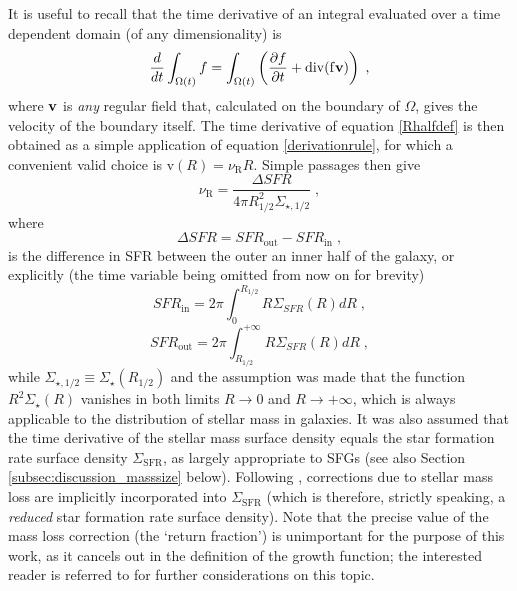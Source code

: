 \documentclass[fleqn,usenatbib]{mnras}
\begin{document}
It is useful to recall that the time derivative of an integral evaluated over a time dependent domain (of any dimensionality) is
\begin{equation}\label{derivationrule}
\frac{d}{dt} \int_{\Omega(t)} f = \int_{\Omega(t)} \left( \frac{\partial f}{\partial t} + \rm{div} (f\bf{v}) \right) \; ,
\end{equation}
where $\bf{v}$ is \emph{any} regular field that, calculated on the boundary of $\Omega$, gives the velocity of the boundary itself. The time derivative of equation \eqref{Rhalfdef} is then obtained as a simple application of equation \eqref{derivationrule}, for which a convenient valid choice is $\mathrm{v}(R) = \nu_\textrm{R} R$. Simple passages then give
\begin{equation}\label{nuRcalc}
\nu_\textrm{R} = \frac{ \Delta SFR}{4 \pi R_{1/2}^2 \Sigma_{\star, 1/2}} \; ,
\end{equation}
where
\begin{equation}\label{deltaSFR}
\Delta SFR = SFR_\textrm{out}-SFR_\textrm{in} \;,
\end{equation}
is the difference in SFR between the outer an inner half of the galaxy, or explicitly (the time variable being omitted from now on for brevity)
\begin{equation}
SFR_\textrm{in} = 2 \pi \int_0^{R_{1/2}} R \Sigma_{SFR}(R) dR \;,
\end{equation}
\begin{equation}
SFR_\textrm{out} = 2 \pi \int_{R_{1/2}}^{+\infty} R \Sigma_{SFR}(R) dR \;,
\end{equation}
while $\Sigma_{\star,1/2} \equiv \Sigma_\star(R_{1/2})$ and the assumption was made that the function $R^2 \Sigma_\star(R)$ vanishes in both limits $R \to 0$ and $R \to + \infty$, which is always applicable to the distribution of stellar mass in galaxies. It was also assumed that the time derivative of the stellar mass surface density equals the star formation rate surface density $\Sigma_\textrm{SFR}$, as largely appropriate to SFGs (see also Section \ref{subsec:discussion_masssize} below). Following \cite{P+15}, corrections due to stellar mass loss are implicitly incorporated into $\Sigma_\textrm{SFR}$ (which is therefore, strictly speaking, a \emph{reduced} star formation rate surface density). Note that the precise value of the mass loss correction (the `return fraction') is unimportant for the purpose of this work, as it cancels out in the definition of the growth function; the interested reader is referred to \cite{P+15} for further considerations on this topic.
\end{document}
